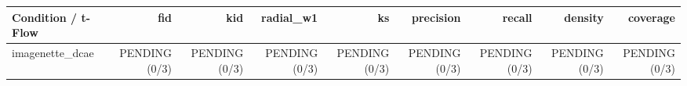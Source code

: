 \begin{tabular}{lrrrrrrrr}
\hline
Condition / t-Flow & fid & kid & radial\_w1 & ks & precision & recall & density & coverage \\
\hline
imagenette\_dcae & PENDING (0/3) & PENDING (0/3) & PENDING (0/3) & PENDING (0/3) & PENDING (0/3) & PENDING (0/3) & PENDING (0/3) & PENDING (0/3) \\
\hline
\end{tabular}
